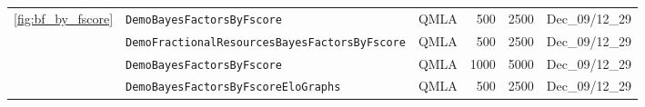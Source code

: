 \begin{tabular}{lllrrl}
\cline{1-6}
\multirow{4}{*}{\cref{fig:bf_by_fscore}} & \texttt{DemoBayesFactorsByFscore} &                                     QMLA &                                      500 &                                     2500 &                           Dec\_09/12\_29 \\
                        & \texttt{DemoFractionalResourcesBayesFactorsByFscore} &                                     QMLA &                                      500 &                                     2500 &                           Dec\_09/12\_29 \\
                        & \texttt{DemoBayesFactorsByFscore} &                                     QMLA &                                     1000 &                                     5000 &                           Dec\_09/12\_29 \\
                        & \texttt{DemoBayesFactorsByFscoreEloGraphs} &                                     QMLA &                                      500 &                                     2500 &                           Dec\_09/12\_29 \\
\hline
\end{tabular}
